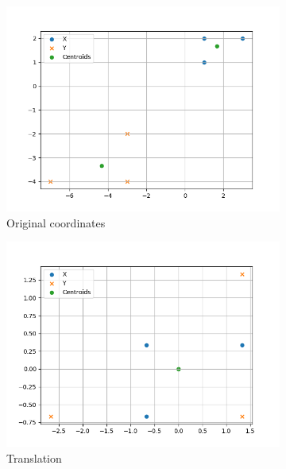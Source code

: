 \begin{figure}[h]
    \centering
    \begin{subfigure}[b]{0.475\textwidth}
        \centering
        \includegraphics[width=\textwidth]{figures/procrustes_ex1}
        \caption[]
        {{\small Original coordinates}}    
        \label{fig:procrustes_ex_1}
    \end{subfigure}
    \begin{subfigure}[b]{0.475\textwidth}  
        \centering 
        \includegraphics[width=\textwidth]{figures/procrustes_ex2}
        \caption[]
        {{\small Translation}}    
        \label{fig:procrustes_ex_2}
    \end{subfigure}
    \begin{subfigure}[b]{0.475\textwidth}   

\end{subfigure}
\end{figure}
